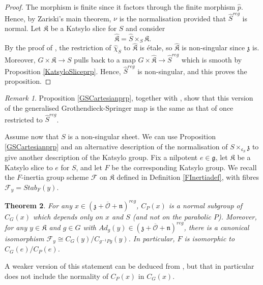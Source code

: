 \documentclass{amsart}
\newtheorem{theorem}{Theorem}
\theoremstyle{remark}
\newtheorem{remark}[theorem]{Remark}
\numberwithin{theorem}{section}
\numberwithin{equation}{section}
\begin{document}
\begin{proof}
The morphism is finite since it factors through the finite morphism $\hat{p}$. Hence, by Zariski's main theorem, $\nu$ is the normalisation provided that $\hat{S}^{reg}$ is normal. Let $\mathfrak{K}$ be a Katsylo slice for $S$ and consider
\begin{equation}\label{GSCartesian2eqn}
    \hat{\mathfrak{K}} =  \hat{S} \times_S \mathfrak{K}.
\end{equation}
By the proof of \cite[Lemma 4.1]{Losev4}, the restriction of $\hat{\chi}_S$ to $\hat{\mathfrak{K}}$ is \'{e}tale, so  $\hat{\mathfrak{K}}$ is non-singular since $\mathfrak{z}$ is. Moreover, $G \times \mathfrak{K} \rightarrow S$ pulls back to a map $G \times \hat{\mathfrak{K}} \rightarrow \hat{S}^{reg}$ which is smooth by Proposition \ref{KatsyloSliceprp}. Hence, $\hat{S}^{reg}$ is non-singular, and this proves the proposition.
\end{proof}

\begin{remark}\label{GSCartesianrmk}
    Proposition \ref{GSCartesianprp}, together with \cite[Corollaries 4.6 \& 5.3(i)]{Broer1}, show that this version of the generalised Grothendieck-Springer map is the same as that of \cite{Broer1} once restricted to $\hat{S}^{reg}$.
\end{remark}

Assume now that $S$ is a non-singular sheet. We can use Proposition \ref{GSCartesianprp} and an alternative description of the normalisation of $S \times_{\mathfrak{c}_S} \mathfrak{z}$ to give another description of the Katsylo group. Fix a nilpotent $e \in \mathfrak{g}$, let $\mathfrak{K}$ be a Katsylo slice to $e$ for $S$, and let $F$ be the corresponding Katsylo group. We recall the $F$-inertia group scheme $\mathcal F$ on $\mathfrak{K}$ defined in Definition \ref{FInertiadef}, with fibres $\mathcal F_y = Stab_F(y)$.

\begin{theorem}\label{KatsylogpPolarisationthm}
    For any $x \in (\mathfrak{z} +\overline{\mathcal O} +\mathfrak{n})^{reg}$, $C_P(x)$ is a normal subgroup of $C_G(x)$ which depends only on $x$ and $S$ (and not on the parabolic $P$). Moreover, for any $y \in \mathfrak{K}$ and $g \in G$ with $Ad_g(y) \in (\mathfrak{z} +\overline{\mathcal O} +\mathfrak{n})^{reg}$, there is a canonical isomorphism $\mathcal F_y \cong C_G(y)/C_{g^{-1}Pg}(y)$. In particular, $F$ is isomorphic to $C_G(e)/C_P(e)$.
\end{theorem}

A weaker version of this statement can be deduced from \cite[Proposition 4.7 (3)]{Losev4}, but that in particular does not include the normality of $C_P(x)$ in $C_G(x)$.
\end{document}
